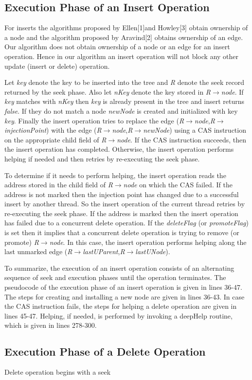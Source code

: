 \documentclass[11pt]{article}
\begin{document}
\begin{multicols}{2}
\subsection{Execution Phase of an Insert Operation}
For inserts the algorithms proposed by Ellen[1]and Howley[3] obtain ownership of a node and the algorithm proposed by Aravind[2] obtains ownership of an edge. Our algorithm does not obtain ownership of a node or an edge for an insert operation. Hence in our algorithm an insert operation will not block any other update (insert or delete) operation.\par
Let \textit{key} denote the key to be inserted into the tree and \textit{R} denote the seek record returned by the seek phase. Also let \textit{nKey} denote the key stored in \textit{R$\rightarrow$node}. If \textit{key} matches with \textit{nKey} then \textit{key} is already present in the tree and insert returns \textit{false}. If they do not match a node \textit{newNode} is created and initialized with key \textit{key}. Finally the insert operation tries to replace the edge (\textit{R$\rightarrow$node},\textit{R$\rightarrow$injectionPoint}) with the edge (\textit{R$\rightarrow$node},\textit{R$\rightarrow$newNode}) using a CAS instruction on the appropriate child field of \textit{R$\rightarrow$node}. If the CAS instruction succeeds, then the insert operation has completed. Otherwise, the insert operation performs helping if needed and then retries by re-executing the seek phase. \par
To determine if it needs to perform helping, the insert operation reads the address stored in the child field of \textit{R$\rightarrow$node} on which the CAS failed. If the address is not marked then the injection point has changed due to a successful insert by another thread. So the insert operation of the current thread retries by re-executing the seek phase. If the address is marked then the insert operation has failed due to a concurrent delete operation. If the \textit{deleteFlag} (or \textit{promoteFlag}) is set then it implies that a concurrent delete operation is trying to remove (or promote) \textit{R$\rightarrow$node}. In this case, the insert operation performs helping along the last unmarked edge (\textit{R$\rightarrow$lastUParent},\textit{R$\rightarrow$lastUNode}).\par
To summarize, the execution of an insert operation consists of an alternating sequence of seek and execution phases until the operation terminates. The pseudocode of the execution phase of an insert operation is given in lines 36-47. The steps for creating and installing a new node are given in lines 36-43. In case the CAS instruction fails, the steps for helping a delete operation are given in lines 45-47. Helping, if needed, is performed by invoking a deepHelp routine, which is given in lines 278-300.

\subsection{Execution Phase of a Delete Operation}
Delete operation begins with a seek
\end{multicols}
\end{document}

